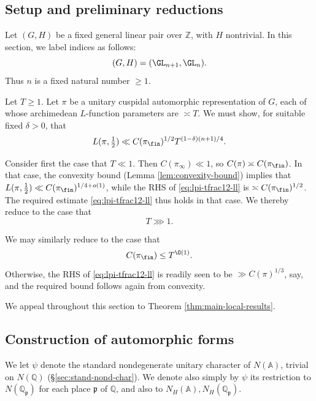 \subsection{Setup and preliminary reductions}\label{sec:setup-prel-reduct}
Let $(G,H)$ be a fixed general linear pair over $\mathbb{Z}$, with $H$ nontrivial.  In this section, we label indices as follows:
\begin{equation*}
  (G,H) = (\GL_{n+1}, \GL_n).
\end{equation*}
Thus $n$ is a fixed natural number $\geq 1$.

Let $T \geq 1$.  Let $\pi$ be a unitary cuspidal automorphic representation of $G$, each of whose archimedean $L$-function parameters are $\asymp T$.  We must show, for suitable fixed $\delta > 0$, that
\begin{equation}\label{eq:lpi-tfrac12-ll}
  L(\pi,\tfrac{1}{2}) \ll C(\pi_{\fin})^{1/2} T^{(1 - \delta) (n+1)/4}.
\end{equation}

Consider first the case that $T \ll 1$.  Then $C(\pi_\infty) \ll 1$, so $C(\pi) \asymp C(\pi_{\fin})$.  In that case, the convexity bound (Lemma \ref{lem:convexity-bound}) implies that $L(\pi,\tfrac{1}{2}) \ll C(\pi_{\fin})^{1/4 + o(1)}$, while the RHS of \eqref{eq:lpi-tfrac12-ll} is $\asymp C(\pi_{\fin})^{1/2}$.  The required estimate \eqref{eq:lpi-tfrac12-ll} thus holds in that case.  We thereby reduce to the case that
\begin{equation}\label{eq:t-ggg-1}
  T \ggg 1.
\end{equation}

We may similarly reduce to the case that
\begin{equation}\label{eq:n_pi-=-to1}
  C(\pi_{\fin}) \leq T^{\O(1)}.
\end{equation}
Otherwise, the RHS of \eqref{eq:lpi-tfrac12-ll} is readily seen to be $\gg C(\pi)^{1/3}$, say, and the required bound follows again from convexity.

We appeal throughout this section to Theorem \ref{thm:main-local-results}.

\subsection{Construction of automorphic forms}\label{sec:constr-autom-forms}
We let $\psi$ denote the standard nondegenerate unitary character of $N(\mathbb{A})$, trivial on $N(\mathbb{Q})$ (\S\ref{sec:stand-nond-char}).  We denote also simply by $\psi$ its restriction to $N(\mathbb{Q}_\mathfrak{p})$ for each place $\mathfrak{p}$ of $\mathbb{Q}$, and also to $N_H(\mathbb{A}), N_H(\mathbb{Q}_\mathfrak{p})$.

